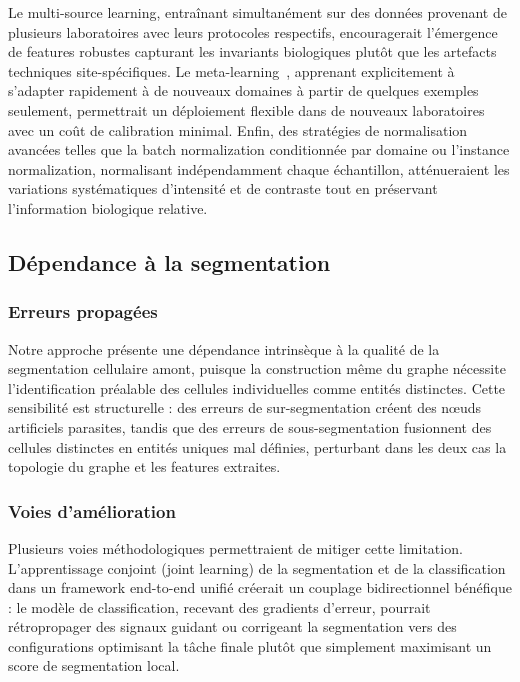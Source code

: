 Le multi-source learning, entraînant simultanément sur des données provenant de plusieurs laboratoires avec leurs protocoles respectifs, encouragerait l'émergence de features robustes capturant les invariants biologiques plutôt que les artefacts techniques site-spécifiques. Le meta-learning~\cite{Finn2017,Hospedales2021}, apprenant explicitement à s'adapter rapidement à de nouveaux domaines à partir de quelques exemples seulement, permettrait un déploiement flexible dans de nouveaux laboratoires avec un coût de calibration minimal. Enfin, des stratégies de normalisation avancées telles que la batch normalization conditionnée par domaine ou l'instance normalization, normalisant indépendamment chaque échantillon, atténueraient les variations systématiques d'intensité et de contraste tout en préservant l'information biologique relative.

\subsection{Dépendance à la segmentation}

\subsubsection{Erreurs propagées}

Notre approche présente une dépendance intrinsèque à la qualité de la segmentation cellulaire amont, puisque la construction même du graphe nécessite l'identification préalable des cellules individuelles comme entités distinctes. Cette sensibilité est structurelle : des erreurs de sur-segmentation créent des nœuds artificiels parasites, tandis que des erreurs de sous-segmentation fusionnent des cellules distinctes en entités uniques mal définies, perturbant dans les deux cas la topologie du graphe et les features extraites.

\subsubsection{Voies d'amélioration}

Plusieurs voies méthodologiques permettraient de mitiger cette limitation. L'apprentissage conjoint (joint learning) de la segmentation et de la classification dans un framework end-to-end unifié créerait un couplage bidirectionnel bénéfique : le modèle de classification, recevant des gradients d'erreur, pourrait rétropropager des signaux guidant ou corrigeant la segmentation vers des configurations optimisant la tâche finale plutôt que simplement maximisant un score de segmentation local.

